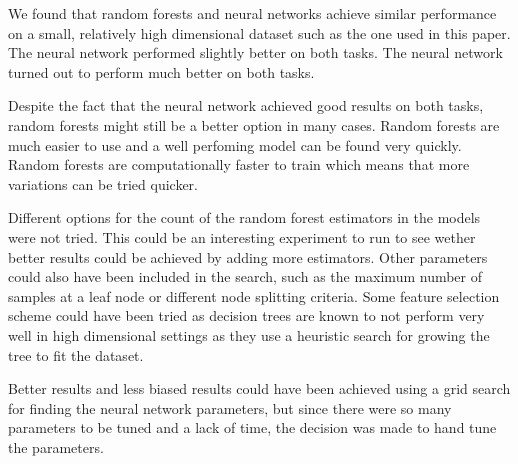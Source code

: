 
We found that random forests and neural networks achieve similar performance on a small, relatively high dimensional dataset such as the one used in this paper. The neural network performed slightly better on both tasks. The neural network turned out to perform much better on both tasks.

Despite the fact that the neural network achieved good results on both tasks, random forests might still be a better option in many cases. Random forests are much easier to use and a well perfoming model can be found very quickly. Random forests are computationally faster to train which means that more variations can be tried quicker.

Different options for the count of the random forest estimators in the models were not tried. This could be an interesting experiment to run to see wether better results could be achieved by adding more estimators. Other parameters could also have been included in the search, such as the maximum number of samples at a leaf node or different node splitting criteria. Some feature selection scheme could have been tried as decision trees are known to not perform very well in high dimensional settings as they use a heuristic search for growing the tree to fit the dataset.

Better results and less biased results could have been achieved using a grid search for finding the neural network parameters, but since there were so many parameters to be tuned and a lack of time, the decision was made to hand tune the parameters.


